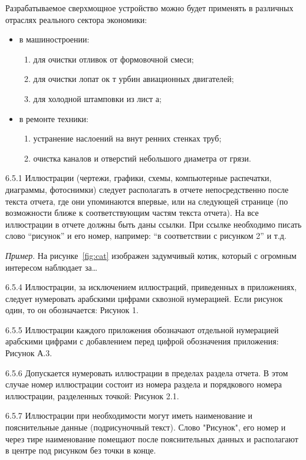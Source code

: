 Разрабатываемое сверхмощное устройство можно будет применять в различных
отраслях реального сектора экономики:
\begin{itemize}
    \item в машиностроении:
    \begin{enumerate}
        \item для очистки отливок от формовочной смеси;
        \item для очистки лопат ок т урбин авиационных двигателей;
        \item для холодной штамповки из лист а;
    \end{enumerate}
    \item в ремонте техники:
    \begin{enumerate}
        \item устранение наслоений на внут ренних стенках труб;
        \item очистка каналов и отверстий небольшого диаметра от грязи.
    \end{enumerate}
\end{itemize}


6.5.1 Иллюстрации (чертежи, графики, схемы, компьютерные распечатки, диаграммы,
фотоснимки) следует располагать в отчете непосредственно после текста отчета,
где они упоминаются впервые, или на следующей странице (по возможности ближе к
соответствующим частям текста отчета). На все иллюстрации в отчете должны быть
даны ссылки. При ссылке необходимо писать слово \enquote{рисунок} и его номер,
например: \enquote{в соответствии с рисунком 2} и т.д.

\emph{Пример}. На рисунке~\ref{fig:cat} изображен задумчивый котик, который
с огромным интересом наблюдает за\ldots


6.5.4 Иллюстрации, за исключением иллюстраций, приведенных в приложениях,
следует нумеровать арабскими цифрами сквозной нумерацией. Если рисунок один, то
он обозначается: Рисунок 1.

6.5.5 Иллюстрации каждого приложения обозначают отдельной нумерацией арабскими
цифрами с добавлением перед цифрой обозначения приложения: Рисунок А.3.

6.5.6 Допускается нумеровать иллюстрации в пределах раздела отчета. В этом
случае номер иллюстрации состоит из номера раздела и порядкового номера
иллюстрации, разделенных точкой: Рисунок 2.1.

6.5.7 Иллюстрации при необходимости могут иметь наименование и пояснительные
данные (подрисуночный текст). Слово "Рисунок", его номер и через тире
наименование помещают после пояснительных данных и располагают в центре под
рисунком без точки в конце.

